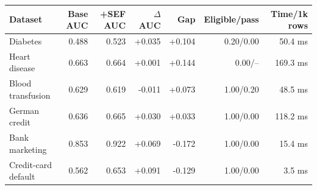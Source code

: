 \begin{tabular}{lrrrrrr}
\toprule
Dataset & Base AUC & +SEF AUC & $\Delta$AUC & Gap & Eligible/pass & Time/1k rows \\
\midrule
Diabetes & 0.488 & 0.523 & +0.035 & +0.104 & 0.20/0.00 & 50.4 ms \\
Heart disease & 0.663 & 0.664 & +0.001 & +0.144 & 0.00/-- & 169.3 ms \\
Blood transfusion & 0.629 & 0.619 & -0.011 & +0.073 & 1.00/0.20 & 48.5 ms \\
German credit & 0.636 & 0.665 & +0.030 & +0.033 & 1.00/0.00 & 118.2 ms \\
Bank marketing & 0.853 & 0.922 & +0.069 & -0.172 & 1.00/0.00 & 15.4 ms \\
Credit-card default & 0.562 & 0.653 & +0.091 & -0.129 & 1.00/0.00 & 3.5 ms \\
\bottomrule
\end{tabular}
